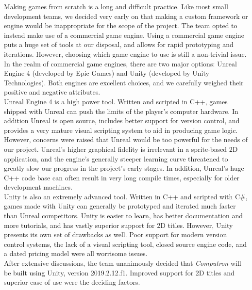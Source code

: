 Making games from scratch is a long and difficult practice. Like most small development 
teams, we decided very early on that making a custom framework or engine would be 
inappropriate for the scope of the project. The team opted to instead make use of a 
commercial game engine. Using a commercial game engine puts a huge set of tools at 
our disposal, and allows for rapid prototyping and iterations. However, choosing which 
game engine to use is still a non-trivial issue. In the realm of commercial game engines, 
there are two major options: Unreal Engine 4 (developed by Epic Games) and Unity 
(developed by Unity Technologies). Both engines are excellent choices, and we carefully 
weighed their positive and negative attributes.\\

Unreal Engine 4 is a high power tool. Written and scripted in C++, games shipped with 
Unreal can push the limits of the player's computer hardware. In addition Unreal is open 
source, includes better support for version control, and provides a very mature visual 
scripting system to aid in producing game logic. However, concerns were raised that 
Unreal would be too powerful for the needs of our project. Unreal's higher graphical 
fidelity is irrelevant in a sprite-based 2D application, and the engine's generally steeper 
learning curve threatened to greatly slow our progress in the project's early stages. In 
addition, Unreal's huge C++ code base can often result in very long compile times, 
especially for older development machines.\\

Unity is also an extremely advanced tool. Written in C++ and scripted with C\#, games 
made with Unity can generally be prototyped and iterated much faster than Unreal 
competitors. Unity is easier to learn, has better documentation and more tutorials, and 
has vastly superior support for 2D titles. However, Unity presents its own set of drawbacks 
as well. Poor support for modern version control systems, the lack of a visual scripting tool, 
closed source engine code, and a dated pricing model were all worrisome issues.\\

After extensive discussions, the team unanimously decided that \textit{Computron} will be 
built using Unity, version 2019.2.12.f1. Improved support for 2D titles and superior 
ease of use were the deciding factors.\\